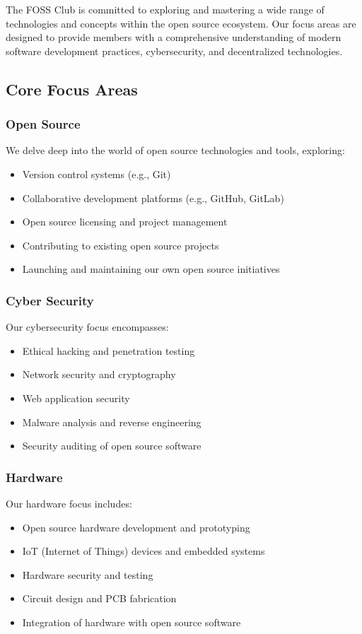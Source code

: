 \documentclass[12pt,a4paper]{article}
\begin{document}
The FOSS Club is committed to exploring and mastering a wide range of technologies and concepts within the open source ecosystem. Our focus areas are designed to provide members with a comprehensive understanding of modern software development practices, cybersecurity, and decentralized technologies.

\subsection{Core Focus Areas}

\subsubsection{Open Source}
We delve deep into the world of open source technologies and tools, exploring:
\begin{itemize}
    \item Version control systems (e.g., Git)
    \item Collaborative development platforms (e.g., GitHub, GitLab)
    \item Open source licensing and project management
    \item Contributing to existing open source projects
    \item Launching and maintaining our own open source initiatives
\end{itemize}

\subsubsection{Cyber Security}
Our cybersecurity focus encompasses:
\begin{itemize}
    \item Ethical hacking and penetration testing
    \item Network security and cryptography
    \item Web application security
    \item Malware analysis and reverse engineering
    \item Security auditing of open source software
\end{itemize}

\subsubsection{Hardware}
Our hardware focus includes:
\begin{itemize}
    \item Open source hardware development and prototyping
    \item IoT (Internet of Things) devices and embedded systems
    \item Hardware security and testing
    \item Circuit design and PCB fabrication
    \item Integration of hardware with open source software
\end{itemize}
\end{document}
